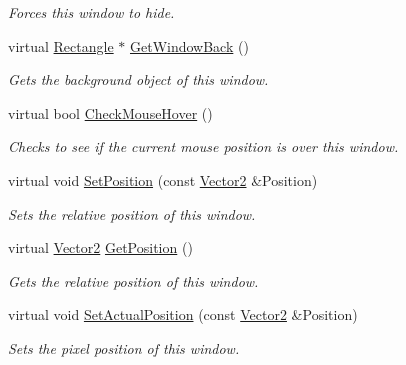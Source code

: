\begin{DoxyCompactItemize}
\begin{DoxyCompactList}\small\item\em Forces this window to hide. \item\end{DoxyCompactList}\item 
virtual \hyperlink{classphys_1_1UI_1_1Rectangle}{Rectangle} $\ast$ \hyperlink{classphys_1_1UI_1_1Window_af06ae5666145e4d8835b38f4a9cbca2a}{GetWindowBack} ()
\begin{DoxyCompactList}\small\item\em Gets the background object of this window. \item\end{DoxyCompactList}\item 
virtual bool \hyperlink{classphys_1_1UI_1_1Window_a771bc9e43c0492ab179d8126c30665cf}{CheckMouseHover} ()
\begin{DoxyCompactList}\small\item\em Checks to see if the current mouse position is over this window. \item\end{DoxyCompactList}\item 
virtual void \hyperlink{classphys_1_1UI_1_1Window_a17e6284d4ac5aa95f257c5168d6cc5ac}{SetPosition} (const \hyperlink{classphys_1_1Vector2}{Vector2} \&Position)
\begin{DoxyCompactList}\small\item\em Sets the relative position of this window. \item\end{DoxyCompactList}\item 
virtual \hyperlink{classphys_1_1Vector2}{Vector2} \hyperlink{classphys_1_1UI_1_1Window_a29fca96d9a2dab29d77a36d6a329f306}{GetPosition} ()
\begin{DoxyCompactList}\small\item\em Gets the relative position of this window. \item\end{DoxyCompactList}\item 
virtual void \hyperlink{classphys_1_1UI_1_1Window_a45a3d0454803ce26a053f645b965d16b}{SetActualPosition} (const \hyperlink{classphys_1_1Vector2}{Vector2} \&Position)
\begin{DoxyCompactList}\small\item\em Sets the pixel position of this window. \item\end{DoxyCompactList}\item 

\end{DoxyCompactItemize}
